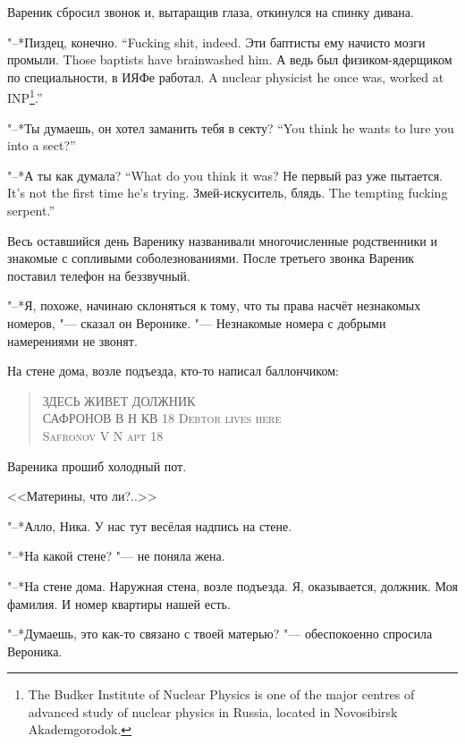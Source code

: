 Вареник сбросил звонок и, вытаращив глаза, откинулся на спинку дивана.

{"--*Пиздец, конечно.}
{``Fucking shit, indeed.}
{Эти баптисты ему начисто мозги промыли.}
{Those baptists have brainwashed him.}
{А ведь был физиком-ядерщиком по специальности, в ИЯФе работал.}
{A nuclear physicist he once was, worked at INP\footnote{The Budker Institute of Nuclear Physics is one of the major centres of advanced study of nuclear physics in Russia, located in Novosibirsk Akademgorodok.}.''}

{"--*Ты думаешь, он хотел заманить тебя в секту?}
{``You think he wants to lure you into a sect?''}

{"--*А ты как думала?}
{``What do you think it was?}
{Не первый раз уже пытается.}
{It's not the first time he's trying.}
{Змей-искуситель, блядь.}
{The tempting fucking serpent.''}

Весь оставшийся день Варенику названивали многочисленные родственники и знакомые с сопливыми соболезнованиями.
После третьего звонка Вареник поставил телефон на беззвучный.

"--*Я, похоже, начинаю склоняться к тому, что ты права насчёт незнакомых номеров, "--- сказал он Веронике.
"--- Незнакомые номера с добрыми намерениями не звонят.

\asterism

\textspace

\label{Mon_2012_06_04}

На стене дома, возле подъезда, кто-то написал баллончиком:

\begin{quote}
{ЗДЕСЬ ЖИВЕТ ДОЛЖНИК\\
САФРОНОВ В Н КВ 18}
{\textsc{Debtor lives here\\
Safronov V N apt 18}}
\end{quote}

Вареника прошиб холодный пот.

<<Материны, что ли?..>>

"--*Алло, Ника.
У нас тут весёлая надпись на стене.

"--*На какой стене? "--- не поняла жена.

"--*На стене дома.
Наружная стена, возле подъезда.
Я, оказывается, должник.
Моя фамилия.
И номер квартиры нашей есть.

"--*Думаешь, это как-то связано с твоей матерью? "--- обеспокоенно спросила Вероника.

